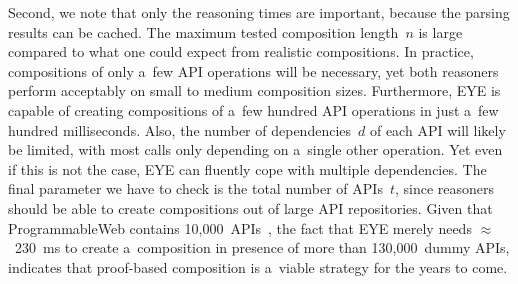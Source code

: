 Second, we note that only the reasoning times are important,
because the parsing results can be cached.
The maximum tested composition length~$n$ is large compared to
what one could expect from realistic compositions.
In practice, compositions of only a~few API operations will be necessary,
yet both reasoners perform acceptably on small to medium composition sizes.
Furthermore, EYE is capable of creating compositions of a~few hundred API operations
in just a~few hundred milliseconds.
Also, the number of dependencies~$d$ of each API will likely be limited,
with most calls only depending on a~single other operation.
Yet even if this is not the case,
EYE can fluently cope with multiple dependencies.
The final parameter we have to check is the total number of APIs~$t$,
since reasoners should be able to create compositions out of large API repositories.
Given that ProgrammableWeb contains 10,000~APIs~\cite{ProgrammableWeb},
the fact that EYE merely needs $\approx$~230~ms
to create a~composition in presence of more than 130,000~dummy APIs,
indicates that proof-based composition is a~viable strategy for the years to come.


